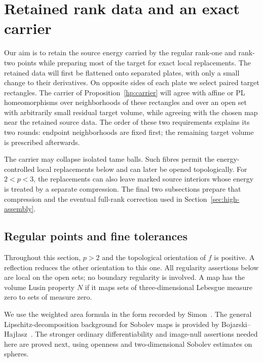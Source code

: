 \documentclass[11pt]{article}
\numberwithin{equation}{section}
\theoremstyle{definition}
\theoremstyle{remark}
\begin{document}
\section{Retained rank data and an exact carrier}\label{sec:high-preparation}

Our aim is to retain the source energy carried by the regular rank-one
and rank-two points while preparing most of the target for exact local
replacements.  The retained data will first be flattened onto separated
plates, with only a small change to their derivatives.  On opposite
sides of each plate we select paired target rectangles.  The carrier
of Proposition~\ref{hp:carrier} will agree with affine or PL
homeomorphisms over neighborhoods of these rectangles and over an open
set with arbitrarily small residual target volume, while agreeing with
the chosen map near the retained source data.  The order of
these two requirements explains its two rounds: endpoint neighborhoods
are fixed first; the remaining target volume is prescribed afterwards.

The carrier may collapse isolated tame balls.  Such fibres permit the
energy-controlled local replacements below and can later be opened
topologically.  For $2<p<3$, the replacements can also leave marked
source interiors whose energy is treated by a separate compression.
The final two subsections prepare that compression and the eventual
full-rank correction used in Section~\ref{sec:high-assembly}.

\subsection{Regular points and fine tolerances}

Throughout this section, $p>2$ and the topological orientation of $f$
is positive.  A reflection reduces the other
orientation to this one.  All regularity assertions below are local on
the open sets; no boundary regularity is involved.  A map has the volume
Lusin property $N$ if it maps sets of three-dimensional Lebesgue
measure zero to sets of measure zero.

We use the weighted area formula in the form recorded by
Simon~\cite[Chapter~2, Section~3, Equations~(3.4)--(3.5)]{Simon2014Draft}.
The general Lipschitz-decomposition background for Sobolev maps is
provided by Bojarski--Haj\l asz~\cite[Theorem~3(1)]{BojarskiHajlasz1993}.
The stronger ordinary differentiability and image-null assertions
needed here are proved next, using openness and two-dimensional
Sobolev estimates on spheres.
\end{document}
